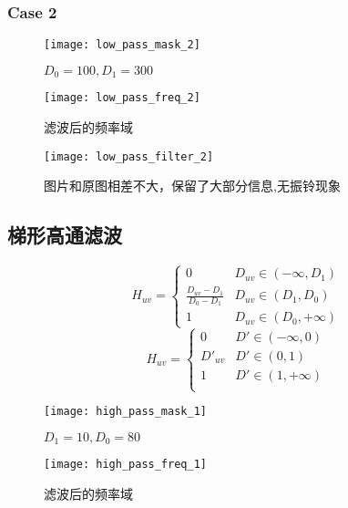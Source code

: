\documentclass{myreport}
\begin{document}
      \subsubsection{Case 2}
        \begin{figure}[H]
          \centering
          \texttt{[image: low\_pass\_mask\_2]}
          \caption{$D_0 = 100, D_1 = 300$}
          \label{fig:ow_pass_mask_2}
        \end{figure}

        \begin{figure}[H]
          \centering
          \texttt{[image: low\_pass\_freq\_2]}
          \caption{滤波后的频率域}
          \label{fig:low_pass_freq_2}
        \end{figure}
        \begin{figure}[H]
          \centering
          \texttt{[image: low\_pass\_filter\_2]}
          \caption{图片和原图相差不大，保留了大部分信息,无振铃现象}
          \label{fig:low_pass_filter_2}
        \end{figure}
  \subsection{梯形高通滤波}
    \begin{equation}
      H_{uv} = \begin{cases}
      0 & D_{uv} \in (-\infty,D_1) \\
      \frac{D_{uv}-D_1}{D_0 - D_1} & D_{uv} \in (D_1, D_0) \\
      1 & D_{uv} \in (D_0,+\infty)
      \end{cases}
    \end{equation}
    \begin{equation}
      H_{uv} = \begin{cases}
        0 & D' \in (-\infty,0) \\
        D'_{uv} & D' \in (0,1) \\
        1 & D' \in (1,+\infty) \\
      \end{cases}
    \end{equation}

    \begin{figure}[H]
      \centering
      \texttt{[image: high\_pass\_mask\_1]}
      \caption{$D_1 = 10, D_0 = 80$}
      \label{fig:high_pass_mask_1}
    \end{figure}
    \begin{figure}[H]
      \centering
      \texttt{[image: high\_pass\_freq\_1]}
      \caption{滤波后的频率域}
      \label{fig:high_pass_freq_1}
    \end{figure}
\end{document}
